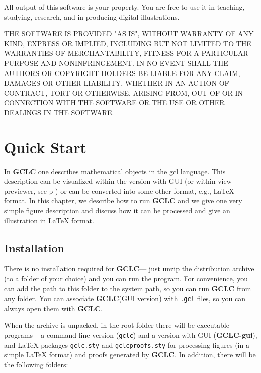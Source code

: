 \documentclass[a4paper]{book}
\newcommand{\gclc}{{\bfseries GCLC}\xspace}
\newcommand{\gclcgui}{{\bfseries GCLC-gui}\xspace}
\begin{document}
All output of this software is your property. You are free to
use it in teaching, studying, research, and in producing digital
illustrations.

THE SOFTWARE IS PROVIDED "AS IS", WITHOUT WARRANTY OF ANY KIND, EXPRESS OR
IMPLIED, INCLUDING BUT NOT LIMITED TO THE WARRANTIES OF MERCHANTABILITY,
FITNESS FOR A PARTICULAR PURPOSE AND NONINFRINGEMENT. IN NO EVENT SHALL THE
AUTHORS OR COPYRIGHT HOLDERS BE LIABLE FOR ANY CLAIM, DAMAGES OR OTHER
LIABILITY, WHETHER IN AN ACTION OF CONTRACT, TORT OR OTHERWISE, ARISING FROM,
OUT OF OR IN CONNECTION WITH THE SOFTWARE OR THE USE OR OTHER DEALINGS IN THE
SOFTWARE.


\chapter{Quick Start}

In \gclc one describes mathematical objects in the {\sc gcl}
language. This description can be visualized within the version with GUI
(or within {\sc view} previewer, see p \pageref{p:view}) or can be converted 
into some other format, e.g., \LaTeX{} format. In this chapter, we describe
how to run \gclc and we give one very simple figure description and 
discuss how it can be processed and give an illustration in \LaTeX{}
format.


\section{Installation}

There is no installation required for \gclc --- just unzip
the distribution archive (to a folder of your choice) and you can
run the program. For convenience, you can add the path to this folder
to the system path, so you can run \gclc from any folder. 
You can associate \gclc (GUI version) with \verb|.gcl| files,
so you can always open them with \gclc.

When the archive is unpacked, in the root folder there will be
executable programs -- a command line version (\verb|gclc|) and 
a version with GUI (\gclcgui), and \LaTeX{} packages \verb|gclc.sty|
and \verb|gclcproofs.sty| for processing figures
(in a simple \LaTeX{} format) and proofs generated by \gclc.
In addition, there will be the following folders:
\end{document}
